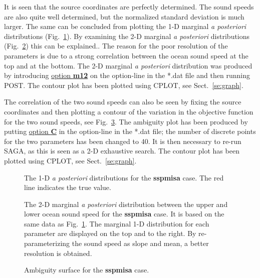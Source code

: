 \documentclass{saclantc}
\begin{document}
It is seen that the source coordinates are perfectly determined. The
sound speeds are also quite well determined, but the normalized
standard deviation is much larger. The same can be concluded from 
plotting the 1-D marginal {\it a posteriori} distributions (Fig.\ 
\ref{fig:sspmisa_ppd}). By examining the 2-D 
marginal {\it a posteriori} distributions (Fig.\ 
\ref{fig:sspmisa_2ppd}) this can be explained.. 
The reason for the poor resolution of the parameters is due to a
strong correlation between the ocean sound speed at the top and at the bottom.
The  2-D marginal {\it a posteriori} distribution was produced by introducing
\underline{option {\bf m12}} 
on the option-line in the *.dat file and then running
{\sf POST}. The contour plot has been plotted using {\sf CPLOT}, see
Sect.~\ref{se:graph}.

The correlation of the two sound speeds can also be seen by fixing the
source coordinates and then plotting a contour of the variation in
the objective function for the two sound speeds, see Fig.\
\ref{fig:sspmisa_amb}. The ambiguity plot has been produced by putting
\underline{option {\bf C}} in the option-line in the *.dat file;
the number of discrete points for the two parameters has been changed
to 40.  It is then necessary to re-run {\sf SAGA}, as this is seen as a 2-D
exhaustive search. The contour plot has been plotted using {\sf CPLOT}, see
Sect.~\ref{se:graph}.

\begin{figure}
\epsfxsize=12cm
\centerline{}
\caption{The 1-D {\it a posteriori} distributions for the {\bf sspmisa} case.
The red line indicates the true value.}
\label{fig:sspmisa_ppd}
\end{figure}
\begin{figure}
\epsfxsize=12cm
\centerline{}
\caption{The 2-D marginal {\it a posteriori}  distribution between the
upper and lower ocean sound speed for the {\bf sspmisa} case.
It is based on the same data as Fig.\ \protect\ref{fig:sspmisa_ppd}.
The marginal 1-D distribution for each parameter are displayed 
on  the top and to the right.
By re-parameterizing the sound speed as  slope and mean, a better
resolution is obtained.}
\label{fig:sspmisa_2ppd}
\end{figure}
\begin{figure}
\epsfxsize=12cm
\centerline{}
\caption{Ambiguity surface for the {\bf sspmisa} case.}
\label{fig:sspmisa_amb}
\end{figure}
\end{document}
